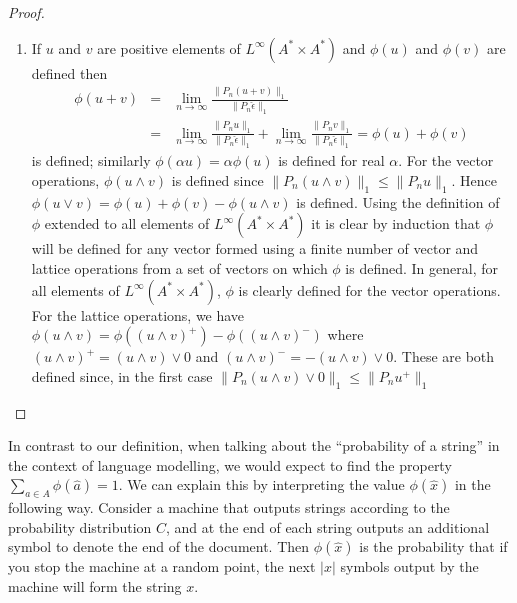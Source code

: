 \begin{proof}
\begin{enumerate}
\item If $u$ and $v$ are positive elements of $L^\infty(A^*\times A^*)$ and $\phi(u)$ and $\phi(v)$ are defined then
\begin{eqnarray*}
\phi(u+v) &=&  \lim_{n\rightarrow\infty} \frac{\|P_n (u+v)\|_1}{\|P_n\hat{\epsilon}\|_1}\\
&=&  \lim_{n\rightarrow\infty} \frac{\|P_n u\|_1}{\|P_n\hat{\epsilon}\|_1} +  \lim_{n\rightarrow\infty} \frac{\|P_n v\|_1}{\|P_n\hat{\epsilon}\|_1} = \phi(u) + \phi(v)
\end{eqnarray*}
is defined; similarly $\phi(\alpha u) = \alpha\phi(u)$ is defined for real $\alpha$. For the vector operations, $\phi(u \land v)$ is defined since $\|P_n(u\land v)\|_1 \le \|P_nu\|_1$. Hence $\phi(u\lor v) = \phi(u) + \phi(v) - \phi(u\land v)$ is defined. Using the definition of $\phi$ extended to all elements of $L^\infty(A^*\times A^*)$ it is clear by induction that $\phi$ will be defined for any vector formed using a finite number of vector and lattice operations from a set of vectors on which $\phi$ is defined. In general, for all elements of $L^\infty(A^*\times A^*)$, $\phi$ is clearly defined for the vector operations. For the lattice operations, we have
$\phi(u\land v) = \phi((u\land v)^+) - \phi((u\land v)^-)$
where $(u\land v)^+ = (u\land v)\lor 0$ and $(u\land v)^- = -(u\land v)\lor 0$. These are both defined since, in the first case $\|P_n(u\land v) \lor 0\|_1 \le \|P_nu^+\|_1$
\end{enumerate}

\end{proof}

In contrast to our definition, when talking about the ``probability of a string'' in the context of language modelling, we would expect to find the property $\sum_{a \in A} \phi(\hat{a}) = 1$.
We can explain this by interpreting the value $\phi(\hat{x})$ in the following way. Consider a machine that outputs strings according to the probability distribution $C$, and at the end of each string outputs an additional symbol to denote the end of the document. Then $\phi(\hat{x})$ is the probability that if you stop the machine at a random point, the next $|x|$ symbols output by the machine will form the string $x$.

